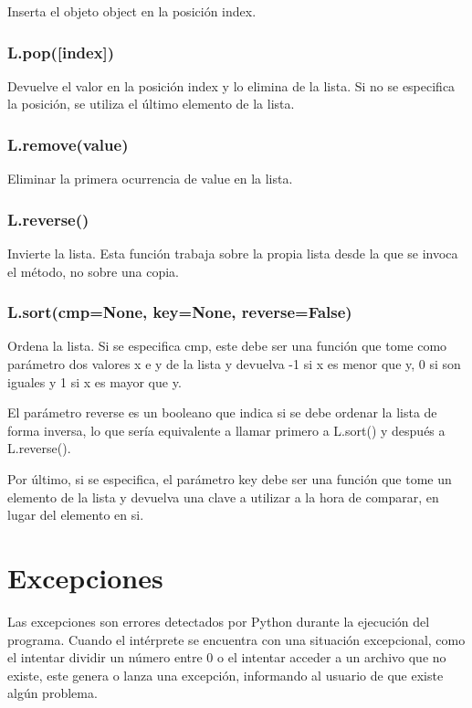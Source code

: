 \documentclass[12pt, twoside]{report}
\begin{document}
Inserta el objeto object en la posición index.

\subsubsection{L.pop([index])}
Devuelve el valor en la posición index y lo elimina de la lista. Si no se especifica la posición, se utiliza el último elemento de la lista.

\subsubsection{L.remove(value)}

Eliminar la primera ocurrencia de value en la lista.

\subsubsection{L.reverse()}
Invierte la lista. Esta función trabaja sobre la propia lista desde la que se invoca el método, no sobre una copia.

\subsubsection{L.sort(cmp=None, key=None, reverse=False)}
Ordena la lista. Si se especifica cmp, este debe ser una función que tome como parámetro dos valores x e y de la lista y devuelva -1 si x es menor que y, 0 si son iguales y 1 si x es mayor que y.

El parámetro reverse es un booleano que indica si se debe ordenar la lista de forma inversa, lo que sería equivalente a llamar primero a L.sort() y después a L.reverse().

Por último, si se especifica, el parámetro key debe ser una función que tome un elemento de la lista y devuelva una clave a utilizar a la hora de comparar, en lugar del elemento en si.


\section{Excepciones}

Las excepciones son errores detectados por Python durante la ejecución del programa. Cuando el intérprete se encuentra con una situación excepcional, como el intentar dividir un número entre 0 o el intentar acceder a un archivo que no existe, este genera o lanza una excepción, informando al usuario de que existe algún problema.
\end{document}
